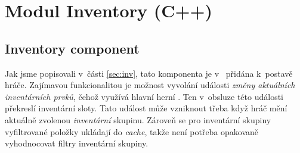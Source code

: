 


\section{Modul Inventory (C++)}


\subsection{Inventory component}

Jak jsme popisovali v~části \ref{sec:inv}, tato komponenta je v~\UEu{} přidána k~postavě hráče. Zajímavou funkcionalitou je možnost vyvolání události \textit{změny aktuálních inventárních prvků}, čehož využívá hlavní herní \HUD{}. Ten v~obsluze této události překreslí inventární sloty. Tato událost může vzniknout třeba když hráč mění aktuálně zvolenou \textit{inventární} skupinu. Zároveň se pro inventární skupiny vyfiltrované položky ukládají do \textit{cache}, takže není potřeba opakovaně vyhodnocovat filtry inventární skupiny.

